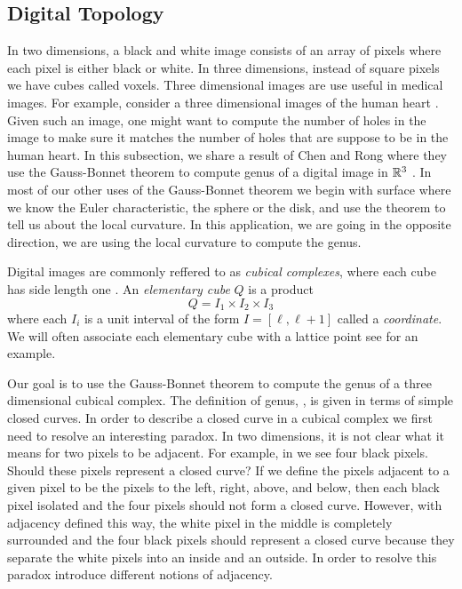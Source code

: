 \subsection{Digital Topology}
\label{sec:digital-topology}

In two dimensions, a black and white image consists of an array of pixels
where each pixel is either black or white.
In three dimensions,
instead of square pixels we have cubes called voxels.
Three dimensional images are use useful in medical images. 
For example, consider a
three dimensional images of the human heart \cite{bovik_handbook_2000}.
Given such an image, one might want to compute
the number of holes in the image to make sure it
matches the number of holes that are suppose to be in
the human heart. In this subsection, we share a result
of Chen and Rong where they 
use the Gauss-Bonnet theorem to 
compute genus of a digital image in $\mathbb{R}^3$ \cite{chen_digital_2010}.
In most of our other uses of the Gauss-Bonnet theorem we begin with surface where we know
the Euler characteristic, the sphere or the disk, and use the theorem to tell us
about the local curvature. In this application, we are going in the opposite direction,
we are using the local curvature to compute the genus.


Digital images are commonly reffered to as \emph{cubical complexes},
where each cube has side length one \cite{kong_digital_1989}.
An \emph{elementary cube} $Q$ is a product
$$Q=I_1\times I_2 \times I_3$$
where each $I_i$ is a unit interval of the form $I=[\ell,\ell+1]$
called a \emph{coordinate}.
We will often associate each elementary cube with a lattice point
see  for an example.

Our goal is to use the Gauss-Bonnet theorem to compute
the genus of a three dimensional cubical complex.
The definition of genus, , is given in terms
of simple closed curves. In order to describe a closed curve in a cubical
complex we first need to resolve an interesting paradox.
In two dimensions, it is not clear what it means
for two pixels to be adjacent. For example, in 
we see four black pixels. Should these pixels represent a closed
curve? If we define the pixels adjacent to a given pixel to be the 
pixels to the left, right, above, and below, then each black pixel isolated
and the four pixels should not form a closed curve. However,
with adjacency defined this way, the white pixel in the middle is completely surrounded 
and the four black pixels should represent a closed curve because
they separate the white pixels into an inside and an outside.
In order to resolve this paradox introduce different notions of adjacency.


